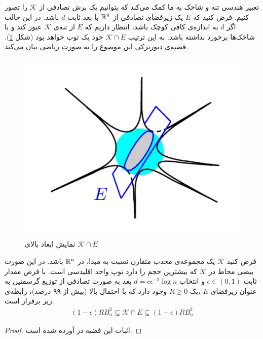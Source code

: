 تعبیر هندسی تنه و شاخک به ما کمک می‌کند که بتوانیم یک برش تصادفی از 
$\mathcal{K}$
را تصور کنیم. فرض کنید که 
$E$
یک زیرفضای تصادفی از
$\mathbb{R}^{n}$
با بعد ثابت
$d$
باشد. در این حالت اگر
$d$
به اندازه‌ی کافی کوچک باشد، انتظار داریم که 
$E$
از تنه‌ی
$\mathcal{K}$
عبور کند و با شاخک‌ها برخورد نداشته باشد. به این ترتیب 
$\mathcal{K}\cap E$
خود یک توپ خواهد بود (شکل
\ref{fig7}).
قضیه‌ی دیورتزکی
این موضوع را به صورت ریاضی بیان می‌کند.
\begin{figure}
\centering
\includegraphics[scale=0.35]{Images/ch2/fig7.png}
\caption{نمایش ابعاد بالا‌ی  
$\mathcal{K}\cap E$
\cite{Plan2016}}
\label{fig7}
\end{figure}

\begin{theorem}
\label{theorem:thm3}
\cite[قضیه~3.3]{vershynin2015estimation}
فرض کنید 
$\mathcal{K}$
یک مجموعه‌ی محدب متقارن نسبت به مبدا، در 
$\mathbb{R}^n$
باشد. در این صورت بیضی محاط در 
$\mathcal{K}$
که بیشترین حجم را دارد توپ واحد اقلیدسی است. با فرض مقدار ثابت
$\epsilon \in (0,1)$
و انتخاب 
$d = c \epsilon^{-2} \log n$
بعد به صورت تصادفی از توزیع گرسمنین
به عنوان زیرفضای
$E$
،یک 
$R\geq 0$
وجود دارد که با احتمال بالا (بیش از ۹۹ درصد)، رابطه‌ی زیر برقرار است.
\begin{align}
\left(1-\epsilon \right)RB^2_n \subseteq \mathcal{K}\cap E \subseteq \left(1+\epsilon \right)RB^2_n 
\end{align}
\end{theorem}
\begin{proof}
اثبات این قضیه در 
\cite{brazitikos2014geometry}
آورده شده است.
\end{proof}

